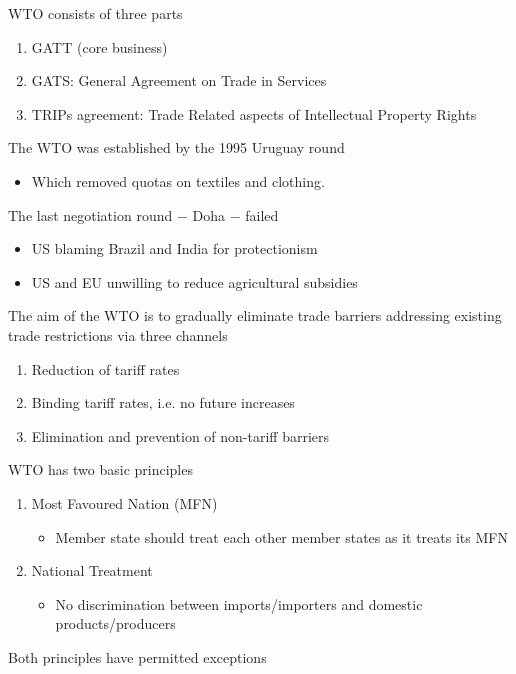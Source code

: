 \documentclass{beamer}
\begin{document}
\begin{frame}
 WTO consists of three parts
 \begin{enumerate}
   \item GATT (core business)
   \item GATS: General Agreement on Trade in Services
   \item TRIPs agreement: Trade Related aspects of Intellectual Property Rights
 \end{enumerate}
\end{frame}

\begin{frame}
The WTO was established by the 1995 Uruguay round 
  \begin{itemize}
    \item Which removed quotas on textiles and clothing. 
  \end{itemize}
  \medskip
  The last negotiation round $-$ Doha $-$ failed
  \begin{itemize}
    \item US blaming Brazil and India for protectionism
    \item US and EU unwilling to reduce agricultural subsidies
  \end{itemize}
\end{frame}

\begin{frame}
 The aim of the WTO is to gradually eliminate trade barriers addressing existing trade restrictions via three channels
  \begin{enumerate}
    \item Reduction of tariff rates
    \item Binding tariff rates, i.e. no future increases
    \item Elimination and prevention of non-tariff barriers
  \end{enumerate}  
\end{frame}

\begin{frame}
 WTO has two basic principles
 \begin{enumerate}
   \item Most Favoured Nation (MFN)
   \begin{itemize}
     \item Member state should treat each other member states as it treats its MFN
   \end{itemize}
   \item National Treatment
   \begin{itemize}
     \item No discrimination between imports/importers and domestic products/producers
   \end{itemize}
 \end{enumerate}
 \medskip
 Both principles have permitted exceptions
\end{frame}
\end{document}

